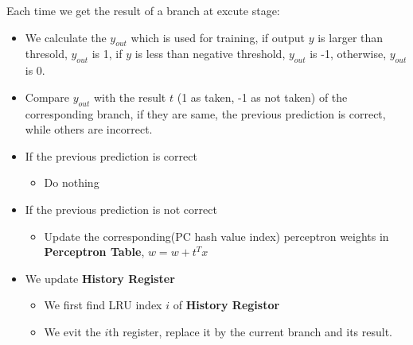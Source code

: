\documentclass{article}
\begin{document}
Each time we get the result of a branch at excute stage:
\begin{itemize}
  \item We calculate the $y_{out}$ which is used for training, if output $y$ is larger than thresold, $y_{out}$ is 1, if $y$ is less than negative threshold, $y_{out}$ is -1, otherwise, $y_{out}$ is 0.
  \item Compare $y_{out}$ with the result $t$ (1 as taken, -1 as not taken) of the corresponding branch, if they are same, the previous prediction is correct, while others are incorrect.
  \item If the previous prediction is correct
    \begin{itemize}
      \item Do nothing
    \end{itemize}
  \item If the previous prediction is not correct
    \begin{itemize}
      \item Update the corresponding(PC hash value index) perceptron weights in \textbf{Perceptron Table}, $w = w + t^Tx$
    \end{itemize}
  \item We update \textbf{History Register}
    \begin{itemize}
      \item We first find LRU index $i$ of \textbf{History Registor}
      \item We evit the $i$th register, replace it by the current branch and its result.
    \end{itemize}
\end{itemize}
\end{document}
